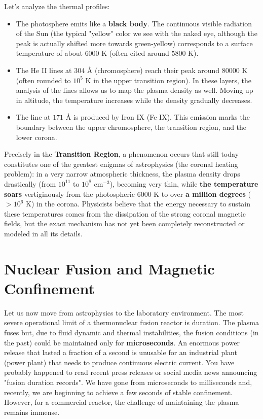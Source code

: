     Let's analyze the thermal profiles:
    \begin{itemize}
        \item The photosphere emits like a \textbf{black body}. The continuous visible radiation of the Sun (the typical "yellow" color we see with the naked eye, although the peak is actually shifted more towards green-yellow) corresponds to a surface temperature of about $6000\text{ K}$ (often cited around $5800\text{ K}$).
        \item The He II lines at $304\text{ \AA}$ (chromosphere) reach their peak around $80000\text{ K}$ (often rounded to $10^5\text{ K}$ in the upper transition region). In these layers, the analysis of the lines allows us to map the plasma density as well. Moving up in altitude, the temperature increases while the density gradually decreases.
        \item The line at $171\text{ \AA}$ is produced by Iron IX (Fe IX). This emission marks the boundary between the upper chromosphere, the transition region, and the lower corona.
    \end{itemize}
    
    Precisely in the \textbf{Transition Region}, a phenomenon occurs that still today constitutes one of the greatest enigmas of astrophysics (the coronal heating problem): in a very narrow atmospheric thickness, the plasma density drops drastically (from $10^{11}$ to $10^{8}\text{ cm}^{-3}$), becoming very thin, while \textbf{the temperature soars} vertiginously from the photospheric $6000\text{ K}$ to over \textbf{a million degrees} ($> 10^6\text{ K}$) in the corona.
    Physicists believe that the energy necessary to sustain these temperatures comes from the dissipation of the strong coronal magnetic fields, but the exact mechanism has not yet been completely reconstructed or modeled in all its details.

\section{Nuclear Fusion and Magnetic Confinement}

Let us now move from astrophysics to the laboratory environment.
The most severe operational limit of a thermonuclear fusion reactor is duration. The plasma fuses but, due to fluid dynamic and thermal instabilities, the fusion conditions (in the past) could be maintained only for \textbf{microseconds}.
An enormous power release that lasted a fraction of a second is unusable for an industrial plant (power plant) that needs to produce continuous electric current. You have probably happened to read recent press releases or social media news announcing "fusion duration records". We have gone from microseconds to milliseconds and, recently, we are beginning to achieve a few seconds of stable confinement. However, for a commercial reactor, the challenge of maintaining the plasma remains immense.

